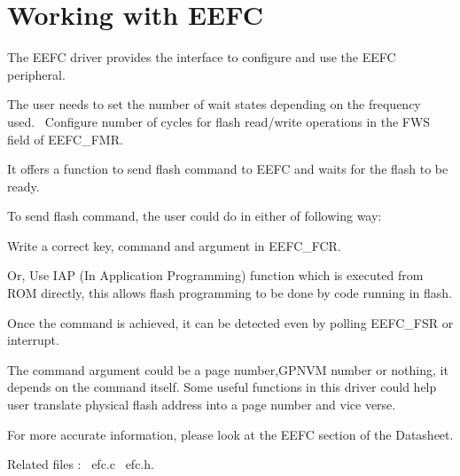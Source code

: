 \hypertarget{group__efc__module}{}\section{Working with E\+E\+FC}
\label{group__efc__module}
The E\+E\+FC driver provides the interface to configure and use the E\+E\+FC peripheral.

The user needs to set the number of wait states depending on the frequency used.~\newline
Configure number of cycles for flash read/write operations in the F\+WS field of E\+E\+F\+C\+\_\+\+F\+MR.

It offers a function to send flash command to E\+E\+FC and waits for the flash to be ready.

To send flash command, the user could do in either of following way\+: 
\begin{DoxyItemize}
\item Write a correct key, command and argument in E\+E\+F\+C\+\_\+\+F\+CR.  
\item Or, Use I\+AP (In Application Programming) function which is executed from R\+OM directly, this allows flash programming to be done by code running in flash. 
\item Once the command is achieved, it can be detected even by polling E\+E\+F\+C\+\_\+\+F\+SR or interrupt. 
\end{DoxyItemize}

The command argument could be a page number,G\+P\+N\+VM number or nothing, it depends on the command itself. Some useful functions in this driver could help user translate physical flash address into a page number and vice verse.

For more accurate information, please look at the E\+E\+FC section of the Datasheet.

Related files \+:~\newline
efc.\+c~\newline
 efc.\+h.~\newline
 